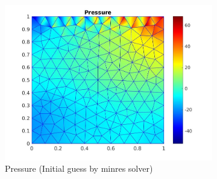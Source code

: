 \documentclass[a4paper]{book}
\begin{document}
\begin{figure}
\begin{subfigure}{\textwidth}
  \includegraphics[width=\linewidth]{lid_newton_pressure_minres.jpg}
  \caption{Pressure (Initial guess by minres solver)}
  \label{pressure_navier_stoke_minres_lid}
\end{subfigure}
\caption{\label{lid_driven_cavity_n_s_minres}}
\end{figure}
\end{document}
